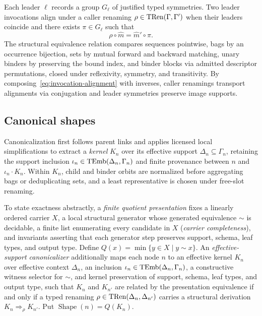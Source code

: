 Each leader $\ell$ records a group $G_\ell$ of justified typed symmetries. Two
leader invocations align under a caller renaming $\rho\in\operatorname{TRen}(\Gamma,\Gamma')$
when their leaders coincide and there exists $\pi\in G_\ell$ such that
\begin{equation}
 \rho\circ\widehat m=\widehat m'\circ\pi.
 \label{eq:invocation-alignment}
\end{equation}
The structural equivalence relation compares sequences pointwise, bags by an
occurrence bijection, sets by mutual forward and backward matching, unary
binders by preserving the bound index, and binder blocks via admitted
descriptor permutations, closed under reflexivity, symmetry, and transitivity.
By composing~\eqref{eq:invocation-alignment} with inverses, caller renamings
transport alignments via conjugation and leader symmetries preserve image
supports.

\subsection{Canonical shapes}
\label{sec:algorithm}

Canonicalization first follows parent links and applies licensed local
simplifications to extract a \emph{kernel} $K_n$ over its effective support
$\Delta_n\subseteq\Gamma_n$, retaining the support inclusion
$\iota_n\in\operatorname{TEmb}(\Delta_n,\Gamma_n)$ and finite provenance between $n$ and
$\iota_n\cdot K_n$. Within $K_n$, child and binder orbits are normalized before
aggregating bags or deduplicating sets, and a least representative is chosen
under free-slot renaming.

To state exactness abstractly, a \emph{finite quotient presentation} fixes a
linearly ordered carrier $X$, a local structural generator whose generated
equivalence $\sim$ is decidable, a finite list enumerating every candidate in
$X$ (\emph{carrier completeness}), and invariants asserting that each generator
step preserves support, schema, leaf types, and output type. Define
$Q(x)=\min\{y\in X\mid y\sim x\}$. An \emph{effective-support canonicalizer}
additionally maps each node $n$ to an effective kernel $K_n$ over effective
context $\Delta_n$, an inclusion $\iota_n\in\operatorname{TEmb}(\Delta_n,\Gamma_n)$, a
constructive witness selector for $\sim$, and kernel preservation of support,
schema, leaf types, and output type, such that $K_n$ and $K_{n'}$ are related
by the presentation equivalence if and only if a typed renaming
$\rho\in\operatorname{TRen}(\Delta_n,\Delta_{n'})$ carries a structural derivation
$K_n\Rightarrow_\rho K_{n'}$. Put $\operatorname{Shape}(n)=Q(K_n)$.


